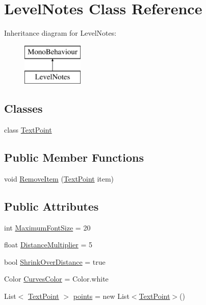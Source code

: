 \hypertarget{class_level_notes}{}\section{Level\+Notes Class Reference}
\label{class_level_notes}
Inheritance diagram for Level\+Notes\+:\begin{figure}[H]
\begin{center}
\leavevmode
\includegraphics[height=2.000000cm]{class_level_notes}
\end{center}
\end{figure}
\subsection*{Classes}
\begin{DoxyCompactItemize}
\item 
class \mbox{\hyperlink{class_level_notes_1_1_text_point}{Text\+Point}}
\end{DoxyCompactItemize}
\subsection*{Public Member Functions}
\begin{DoxyCompactItemize}
\item 
void \mbox{\hyperlink{class_level_notes_a3dbcfb27abdf6245eede1ec1f3f1117b}{Remove\+Item}} (\mbox{\hyperlink{class_level_notes_1_1_text_point}{Text\+Point}} item)
\end{DoxyCompactItemize}
\subsection*{Public Attributes}
\begin{DoxyCompactItemize}
\item 
int \mbox{\hyperlink{class_level_notes_ab121206e2192ea8272982747f04ff836}{Maximum\+Font\+Size}} = 20
\item 
float \mbox{\hyperlink{class_level_notes_a00de175765c94e24b9c3143d7d996e8d}{Distance\+Multiplier}} = 5
\item 
bool \mbox{\hyperlink{class_level_notes_a525161818a63bbbb31a275da52d779f0}{Shrink\+Over\+Distance}} = true
\item 
Color \mbox{\hyperlink{class_level_notes_a07d256662141eeb70e6912c288554006}{Curves\+Color}} = Color.\+white
\item 
List$<$ \mbox{\hyperlink{class_level_notes_1_1_text_point}{Text\+Point}} $>$ \mbox{\hyperlink{class_level_notes_ae4cc65d86f40bc434a44e80764ab8390}{points}} = new List$<$\mbox{\hyperlink{class_level_notes_1_1_text_point}{Text\+Point}}$>$()
\end{DoxyCompactItemize}



